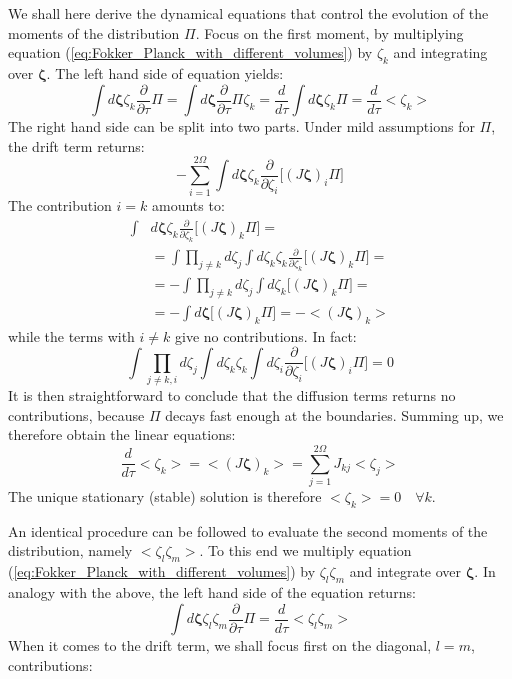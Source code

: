 \documentclass[showpacs,prl,superscriptaddress,nofootinbib, twocolumn]{revtex4}
\begin{document}
We shall here derive the dynamical equations that control the evolution of the moments of the distribution $\Pi$. Focus on the first moment, by
multiplying  equation (\ref{eq:Fokker_Planck_with_different_volumes}) by $\zeta_k$ and integrating over ${\boldsymbol \zeta}$.
The left hand side  of  equation yields:
\[
\int d{\boldsymbol \zeta}\zeta_k \frac{\partial}{\partial\tau}\Pi=\int d{\boldsymbol \zeta}\frac{\partial}{\partial\tau}\Pi\zeta_k=\frac{d}{d\tau}\int d{\boldsymbol \zeta}\zeta_k\Pi=\frac{d}{d\tau}<\zeta_k>
\]
The right hand side can be split into two parts.  Under mild assumptions for $\Pi$, the drift term returns:
\[
-\sum_{i=1}^{2\Omega} \int d{\boldsymbol \zeta} \zeta_k\frac{\partial}{\partial\zeta_i}\big[ (J{\boldsymbol \zeta})_i\Pi\big]
\]
The contribution $i=k$ amounts to:
\[
\begin{split}
\int &d{\boldsymbol \zeta} \zeta_k\frac{\partial}{\partial\zeta_k}\big[ (J{\boldsymbol \zeta})_k\Pi\big]=\\
&=\int \prod_{j \neq k} d\zeta_j \int d\zeta_k \zeta_k\frac{\partial}{\partial\zeta_k}\big[ (J{\boldsymbol \zeta})_k\Pi\big]=\\
&=-\int \prod_{j \neq k} d\zeta_j \int d\zeta_k\big[ (J{\boldsymbol \zeta})_k\Pi\big]= \\
&=-\int d{\boldsymbol \zeta}\big[ (J{\boldsymbol \zeta})_k\Pi\big]=-<(J{\boldsymbol \zeta})_k>
\end{split}
\]
while the terms with $i\neq k$ give no contributions. In fact:
\[
\int \prod_{j \neq k,i} d\zeta_j \int d\zeta_k \zeta_k \int d\zeta_i \frac{\partial}{\partial\zeta_i}\big[ (J{\boldsymbol \zeta})_i\Pi\big]=0
\]
It is then straightforward to conclude that the diffusion terms returns no contributions, because $\Pi$ decays fast enough at the boundaries. 
 Summing up, we therefore obtain the linear equations:
\[
\frac{d}{d\tau}<\zeta_k>=<(J{\boldsymbol \zeta})_k>=\sum_{j=1}^{2\Omega}J_{kj}<\zeta_j>
\]
The unique stationary (stable) solution is therefore  $<\zeta_k>=0 \quad \forall k$.

An identical procedure can be followed to evaluate the second moments of the distribution, namely $<\zeta_l\zeta_m>$. To this end we multiply equation (\ref{eq:Fokker_Planck_with_different_volumes}) by $\zeta_l\zeta_m$ and integrate over ${\boldsymbol \zeta}$. 
In analogy with the above, the left hand side of the equation returns: 
\[
\int d{\boldsymbol \zeta} \zeta_l\zeta_m \frac{\partial}{\partial\tau}\Pi= \frac{d}{d\tau}<\zeta_l\zeta_m>
\]
When it comes to the drift term, we shall focus first on the diagonal, $l=m$, contributions:
\end{document}
